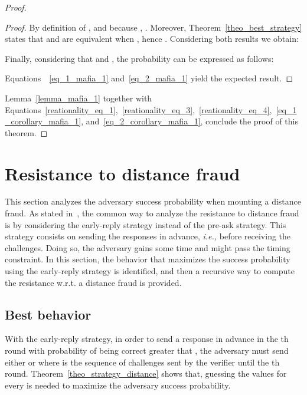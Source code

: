 \documentclass{llncs}
\begin{document}
\begin{proof}
\begin{proof}

\noindent By definition of , and because , . Moreover, Theorem~\ref{theo_best_strategy} states that  and 
 are equivalent when , hence . Considering both results we 
obtain:







\noindent Finally, considering that  and , 
the probability  can be 
expressed as follows:

\noindent Equations~~\ref{eq_1_mafia_1} and~\ref{eq_2_mafia_1} yield the 
expected result. 

\end{proof}


\noindent Lemma~\ref{lemma_mafia_1} together with  
Equations~\ref{reationality_eq_1},~\ref{reationality_eq_3},~\ref{reationality_eq_4},~\ref{eq_1_corollary_mafia_1},
 and~\ref{eq_2_corollary_mafia_1}, conclude the proof of this theorem.  


\end{proof}




\section{Resistance to distance fraud} \label{sec:distance}

This section analyzes the adversary success probability when mounting a 
distance fraud. As stated in~\cite{AvoineBKLM-2011-jcs}, the common way to 
analyze the resistance to distance fraud is by considering the early-reply 
strategy instead of the pre-ask strategy. This strategy consists on sending the 
responses in advance, \emph{i.e.,} before receiving the challenges. Doing so, 
the adversary gains some time and might pass the timing constraint. In this 
section, the behavior that maximizes the success probability using the 
early-reply strategy is identified, and then a recursive way to compute the 
resistance w.r.t. a distance fraud is provided.

\subsection{Best behavior}

With the early-reply strategy, in order to send a response in advance in the 
th round with probability of being correct greater that , the 
adversary must send either  or  where  is the sequence of challenges sent 
by the verifier until the th round. Theorem~\ref{theo_strategy_distance} 
shows that, guessing the values  for every  is needed to maximize the adversary success probability.
\end{document}
